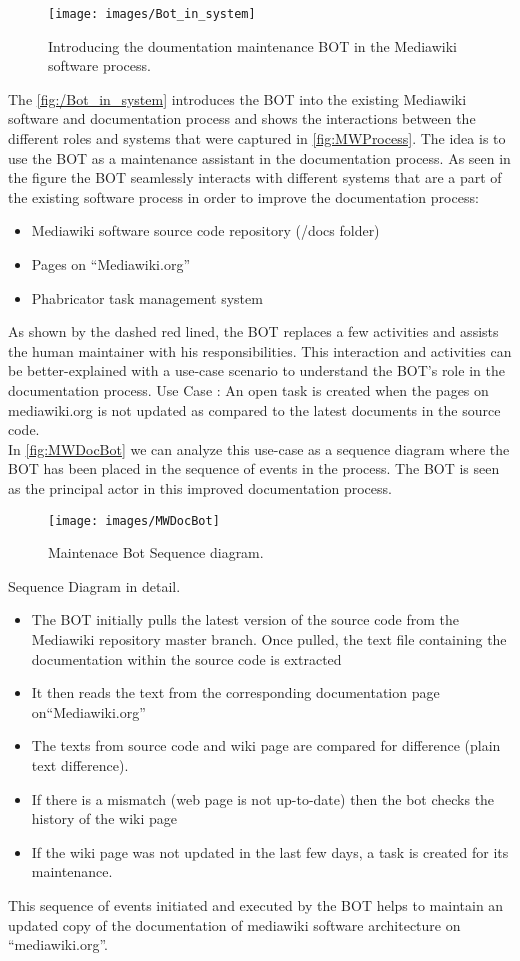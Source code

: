 \begin{figure}[H]
  \centering
  \texttt{[image: images/Bot\_in\_system]}
  \caption[Introducing the doumentation maintenance BOT in the Mediawiki software process]{Introducing the doumentation maintenance BOT in the Mediawiki software process.}\label{fig:/Bot_in_system}
\end{figure}
The \autoref{fig:/Bot_in_system} introduces the BOT into the existing Mediawiki software and documentation process and shows the interactions between the different roles and systems that were captured in \autoref{fig:MWProcess}.
\indent The idea is to use the BOT as a maintenance assistant in the documentation process. As seen in the figure the BOT seamlessly interacts with different systems that are a part of the existing software process in order to improve the documentation process:
\begin{itemize}
\item Mediawiki software source code repository (/docs folder)
\item Pages on \enquote{Mediawiki.org}
\item Phabricator task management system
\end{itemize}
As shown by the dashed red lined, the BOT replaces a few activities and assists the human maintainer with his responsibilities.
This interaction and activities can be better-explained with a use-case scenario to understand the BOT's role in the documentation process. 
\indent Use Case : An open task is created when the pages on mediawiki.org is not updated as compared to the latest documents in the source code.
\\\indent  In \autoref{fig:MWDocBot} we can analyze this use-case as a sequence diagram where the BOT has been placed in the sequence of events in the process. The BOT is seen as the principal actor in this improved documentation process.
\begin{figure}[H]
  \centering
  \texttt{[image: images/MWDocBot]}
  \caption[Maintenace Bot Sequence diagram]{Maintenace Bot Sequence diagram.}\label{fig:MWDocBot}
\end{figure}
Sequence Diagram in detail. 
\begin{itemize}
\item The BOT initially pulls the latest version of the source code from the Mediawiki repository master branch. Once pulled, the text file containing the documentation within the source code is extracted
\item It then reads the text from the corresponding documentation page on\enquote{Mediawiki.org}
\item The texts from source code and wiki page are compared for difference (plain text difference).
\item If there is a mismatch (web page is not up-to-date) then the bot checks the history of the wiki  page
\item If the wiki page was not updated in the last few days, a task is created for its maintenance.
\end{itemize}
This sequence of events initiated and executed by the BOT helps to maintain an updated copy of the documentation of mediawiki software architecture on \enquote{mediawiki.org}.  

